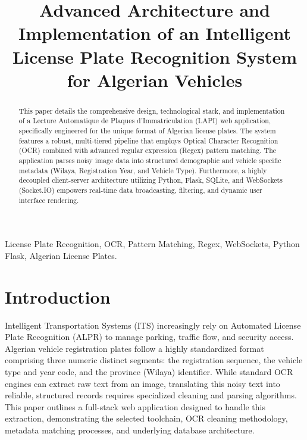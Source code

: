 \documentclass[conference]{IEEEtran}
\begin{document}
\title{Advanced Architecture and Implementation of an Intelligent License Plate Recognition System for Algerian Vehicles}

\author{
}

\maketitle

\begin{abstract}
This paper details the comprehensive design, technological stack, and implementation of a Lecture Automatique de Plaques d'Immatriculation (LAPI) web application, specifically engineered for the unique format of Algerian license plates. The system features a robust, multi-tiered pipeline that employs Optical Character Recognition (OCR) combined with advanced regular expression (Regex) pattern matching. The application parses noisy image data into structured demographic and vehicle specific metadata (Wilaya, Registration Year, and Vehicle Type). Furthermore, a highly decoupled client-server architecture utilizing Python, Flask, SQLite, and WebSockets (Socket.IO) empowers real-time data broadcasting, filtering, and dynamic user interface rendering. 
\end{abstract}

\begin{IEEEkeywords}
License Plate Recognition, OCR, Pattern Matching, Regex, WebSockets, Python Flask, Algerian License Plates.
\end{IEEEkeywords}

\section{Introduction}
Intelligent Transportation Systems (ITS) increasingly rely on Automated License Plate Recognition (ALPR) to manage parking, traffic flow, and security access. Algerian vehicle registration plates follow a highly standardized format comprising three numeric distinct segments: the registration sequence, the vehicle type and year code, and the province (Wilaya) identifier. While standard OCR engines can extract raw text from an image, translating this noisy text into reliable, structured records requires specialized cleaning and parsing algorithms. This paper outlines a full-stack web application designed to handle this extraction, demonstrating the selected toolchain, OCR cleaning methodology, metadata matching processes, and underlying database architecture.
\end{document}
